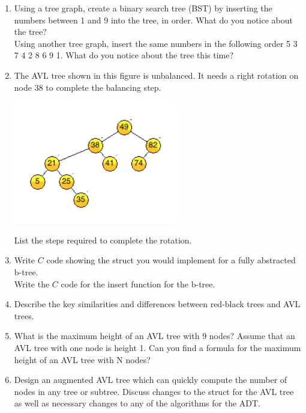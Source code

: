 \documentclass{article}
\begin{document}
\begin{enumerate}
	\item Using a tree graph, create a binary search tree (BST) by inserting the numbers between 1 and 9 into the tree, in order. What do you notice about the tree? 
		\vspace{5cm} \\
		Using another tree graph, insert the same numbers in the following order 5 3 7 4 2 8 6 9 1. What do you notice about the tree this time?
	\vspace{5cm}
	\item The AVL tree shown in this figure is unbalanced. It needs a right rotation on node 38 to complete the balancing step. 
		\begin{center}
			\includegraphics[scale=0.75]{avltree}
		\end{center}
		List the steps required to complete the rotation.
	\vspace{3cm}
	\item Write \(C\) code showing the struct you would implement for a fully abstracted b-tree. 
		\vspace{4cm} \\
		Write the \(C\) code for the insert function for the b-tree.
	\vspace{4cm}
	\item Describe the key similarities and differences between red-black trees and AVL trees.
	\vspace{4cm}
	\item What is the maximum height of an AVL tree with 9 nodes? Assume that an AVL tree with one node is height 1. Can you find a formula for the maximum height of an AVL tree with N nodes?
	\vspace{4cm}
	\item Design an augmented AVL tree which can quickly compute the number of nodes in any tree or subtree. Discuss changes to the struct for the AVL tree as well as necessary changes to any of the algorithms for the ADT.
	\vspace{12cm}

\end{enumerate}
\end{document}
